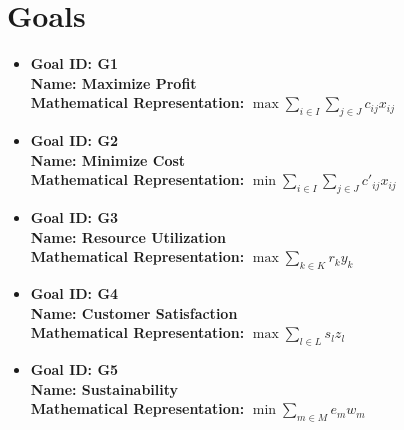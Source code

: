 \documentclass{article}
\begin{document}
\section{Goals}
\begin{itemize}
    \item \textbf{Goal ID: G1} \\
          \textbf{Name: Maximize Profit} \\
          \textbf{Mathematical Representation:} $\max \sum_{i \in I} \sum_{j \in J} c_{ij} x_{ij}$

    \item \textbf{Goal ID: G2} \\
          \textbf{Name: Minimize Cost} \\
          \textbf{Mathematical Representation:} $\min \sum_{i \in I} \sum_{j \in J} c'_{ij} x_{ij}$

    \item \textbf{Goal ID: G3} \\
          \textbf{Name: Resource Utilization} \\
          \textbf{Mathematical Representation:} $\max \sum_{k \in K} r_k y_k$

    \item \textbf{Goal ID: G4} \\
          \textbf{Name: Customer Satisfaction} \\
          \textbf{Mathematical Representation:} $\max \sum_{l \in L} s_l z_l$

    \item \textbf{Goal ID: G5} \\
          \textbf{Name: Sustainability} \\
          \textbf{Mathematical Representation:} $\min \sum_{m \in M} e_m w_m$
\end{itemize}
\end{document}
